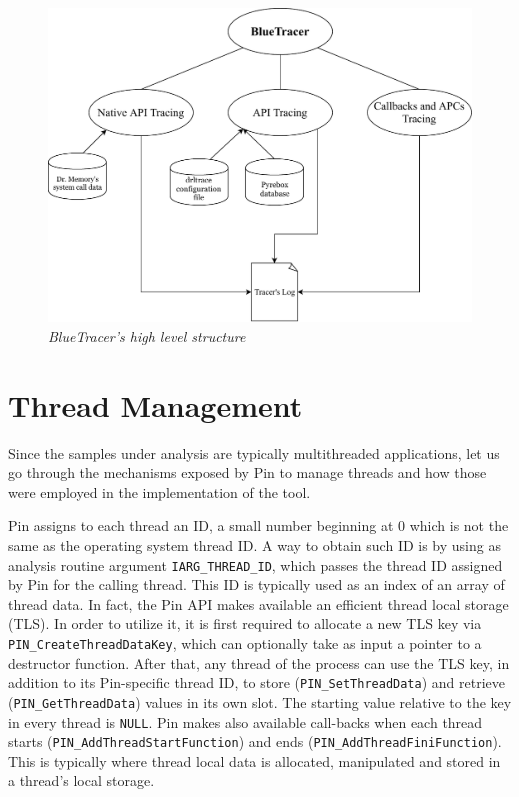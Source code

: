 \documentclass[binding=0.6cm,LaM,english,noexaminfo,oneside]{sapthesis} %
\begin{document}
\begin{figure}[h]
\centering
\includegraphics[scale=0.8]{Figures/BlueTracer.pdf}
\caption{\textit{BlueTracer's high level structure}}
\end{figure}

\section{Thread Management}

Since the samples under analysis are typically multithreaded applications, let us go through the mechanisms exposed by Pin to manage threads and how those were employed in the implementation of the tool.

Pin assigns to each thread an ID, a small number beginning at 0
which is not the same as the operating system thread ID. A way to obtain such ID is by using as analysis routine argument \texttt{IARG\_THREAD\_ID}, which passes the thread ID assigned by Pin for the calling thread. This ID is typically used as an index of an array of thread data.
In fact, the Pin API makes available an efficient thread local storage (TLS). In order to utilize it, it is first required to allocate a new TLS key via \texttt{PIN\_CreateThreadDataKey}, which can optionally take as input a pointer to a destructor function. After that, any thread of the process can use the TLS key, in addition to its Pin-specific thread ID, to store (\texttt{PIN\_SetThreadData}) and retrieve (\texttt{PIN\_GetThreadData}) values in its own slot. The starting value relative to the key in every thread is \texttt{NULL}.
Pin makes also available call-backs when each thread starts (\texttt{PIN\_AddThreadStartFunction}) and ends (\texttt{PIN\_AddThreadFiniFunction}). This is typically where thread local data is allocated, manipulated and stored in a thread's local storage\cite{Pin}.
\end{document}

